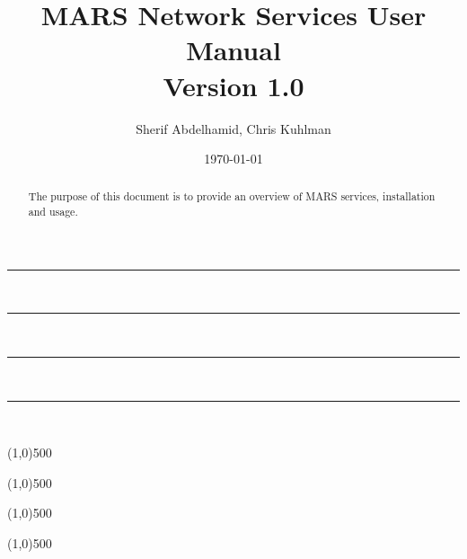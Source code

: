 \documentclass{article}%
\newcommand{\HRule}{\rule{\linewidth}{0.5mm}}
\begin{document}
\title{MARS Network Services User Manual\\
Version 1.0}

\author{Sherif Abdelhamid, Chris Kuhlman}

\date{\today}
\maketitle


\tiny

\HRule \\[0.05cm]

\HRule \\[0.05cm]

\small

\tableofcontents

\tiny

\HRule \\[0.05cm]

\HRule \\[0.05cm]

\normalsize


\begin{abstract}

The purpose of this document is to provide an overview of MARS services, installation and usage.

\end{abstract}




\line(1,0){500}



\line(1,0){500}



\line(1,0){500}

\line(1,0){500}
%
%

%
%
\end{document}
